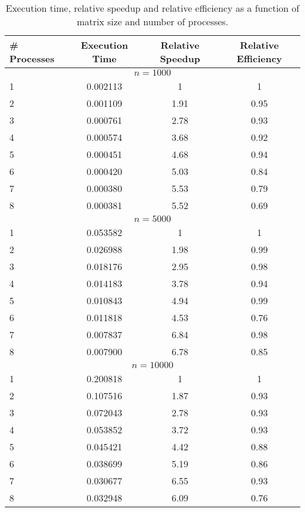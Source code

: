 \documentclass[11pt,a4paper,onecolumn]{article}
\begin{document}
\begin{table}[H]
  \centering
  \begin{tabular}{l | c | c | c}
    \# Processes & Execution Time & Relative Speedup & Relative Efficiency \\
    \hline
    \multicolumn{4}{c}{$n = 1000$} \\
    \hline
    1 & 0.002113 & 1 & 1 \\ 
    2 & 0.001109 & 1.91 & 0.95 \\
    3 & 0.000761 & 2.78 & 0.93 \\
    4 & 0.000574 & 3.68 & 0.92 \\
    5 & 0.000451 & 4.68 & 0.94 \\
    6 & 0.000420 & 5.03 & 0.84 \\
    7 & 0.000380 & 5.53 & 0.79 \\
    8 & 0.000381 & 5.52 & 0.69 \\
    \hline
    \multicolumn{4}{c}{$n = 5000$} \\
    \hline
    1 & 0.053582 & 1 & 1 \\
    2 & 0.026988 & 1.98 & 0.99 \\
    3 & 0.018176 & 2.95 & 0.98 \\
    4 & 0.014183 & 3.78 & 0.94 \\
    5 & 0.010843 & 4.94 & 0.99 \\
    6 & 0.011818 & 4.53 & 0.76 \\
    7 & 0.007837 & 6.84 & 0.98 \\ 
    8 & 0.007900 & 6.78 & 0.85 \\
    \hline
    \multicolumn{4}{c}{$n = 10000$} \\
    \hline
    1 & 0.200818 & 1 & 1 \\ 
    2 & 0.107516 & 1.87 & 0.93 \\ 
    3 & 0.072043 & 2.78 & 0.93 \\
    4 & 0.053852 & 3.72 & 0.93 \\
    5 & 0.045421 & 4.42 & 0.88 \\
    6 & 0.038699 & 5.19 & 0.86 \\
    7 & 0.030677 & 6.55 & 0.93 \\
    8 & 0.032948 & 6.09 & 0.76 \\
  \end{tabular}
  \caption{Execution time, relative speedup and relative efficiency as a function of matrix size and number of processes.}
  \label{tab:mult}
\end{table}
\end{document}
